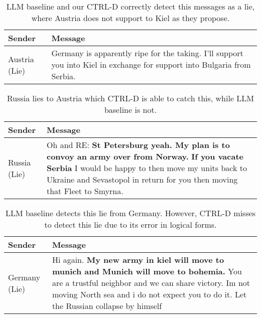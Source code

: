 \begin{table}[b!]
    \begin{tabular}{p{1.2cm}p{5.5cm}}
    \hline
    \textbf{Sender} & \textbf{Message}   \\ 
    \hline
     \rowcolor{grayish} Austria (Lie) & \small{Germany is apparently ripe for the taking. I'll support you into Kiel in exchange for support into Bulgaria from Serbia.} \\ 
  \hline
    \end{tabular}
    \caption{LLM baseline and our CTRL-D correctly detect this messages as a lie, where Austria does not support to Kiel as they propose.}
    \label{tab:tp_both}
\end{table}

\begin{table}[b!]
    \begin{tabular}{p{1.2cm}p{5.5cm}}
    \hline
    \textbf{Sender} & \textbf{Message}   \\ 
    \hline
     \rowcolor{grayish} Russia (Lie) & \small{Oh and RE: \textbf{St Petersburg yeah. My plan is to convoy an army over from Norway.} \textbf{If you vacate Serbia} I would be happy to then move my units back to Ukraine and Sevastopol in return for you then moving that Fleet to Smyrna.} \\ 
  \hline
    \end{tabular}
    \caption{Russia lies to Austria which CTRL-D is able to catch this, while LLM baseline is not.}
    \label{tab:tp_cfrl}
\end{table}

\begin{table}[b!]
    \begin{tabular}{p{1.2cm}p{5.5cm}}
    \hline
    \textbf{Sender} & \textbf{Message}   \\ 
    \hline
     \rowcolor{grayish} Germany (Lie) & \small{Hi again. \textbf{My new army in kiel will move to munich and Munich will move to bohemia.} You are a trustful neighbor and we can share victory. Im not moving North sea and i do not expect you to do it. Let the Russian collapse by himself} \\ 
  \hline
    \end{tabular}
    \caption{LLM baseline detects this lie from Germany. However, CTRL-D misses to detect this lie due to its error in logical forms.}
    \label{tab:tp_llama3}
\end{table}